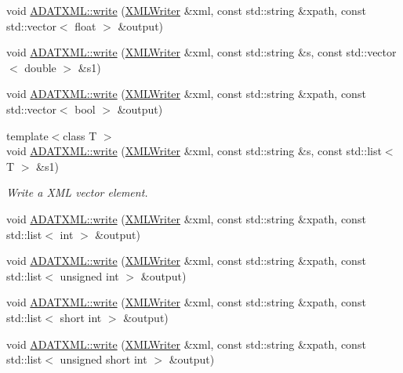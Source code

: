 \begin{DoxyCompactItemize}
\item 
void \mbox{\hyperlink{group__io_ga21089f03811e37a0d78c969c6a611f59}{A\+D\+A\+T\+X\+M\+L\+::write}} (\mbox{\hyperlink{classADATXML_1_1XMLWriter}{X\+M\+L\+Writer}} \&xml, const std\+::string \&xpath, const std\+::vector$<$ float $>$ \&output)
\item 
void \mbox{\hyperlink{group__io_gab54b00e1a7cbc507061351d54d6de9fe}{A\+D\+A\+T\+X\+M\+L\+::write}} (\mbox{\hyperlink{classADATXML_1_1XMLWriter}{X\+M\+L\+Writer}} \&xml, const std\+::string \&s, const std\+::vector$<$ double $>$ \&s1)
\item 
void \mbox{\hyperlink{group__io_ga5ca658ba9d302064625a4be34293839a}{A\+D\+A\+T\+X\+M\+L\+::write}} (\mbox{\hyperlink{classADATXML_1_1XMLWriter}{X\+M\+L\+Writer}} \&xml, const std\+::string \&xpath, const std\+::vector$<$ bool $>$ \&output)
\item 
{\footnotesize template$<$class T $>$ }\\void \mbox{\hyperlink{group__io_ga442a3dd5472737a074d3774f46a94f14}{A\+D\+A\+T\+X\+M\+L\+::write}} (\mbox{\hyperlink{classADATXML_1_1XMLWriter}{X\+M\+L\+Writer}} \&xml, const std\+::string \&s, const std\+::list$<$ T $>$ \&s1)
\begin{DoxyCompactList}\small\item\em Write a X\+ML vector element. \end{DoxyCompactList}\item 
void \mbox{\hyperlink{group__io_gaab9fb8d6cd603f8b6b5c6b493935eade}{A\+D\+A\+T\+X\+M\+L\+::write}} (\mbox{\hyperlink{classADATXML_1_1XMLWriter}{X\+M\+L\+Writer}} \&xml, const std\+::string \&xpath, const std\+::list$<$ int $>$ \&output)
\item 
void \mbox{\hyperlink{group__io_ga6026879ab5fc4a25f24c2f9f88d731b5}{A\+D\+A\+T\+X\+M\+L\+::write}} (\mbox{\hyperlink{classADATXML_1_1XMLWriter}{X\+M\+L\+Writer}} \&xml, const std\+::string \&xpath, const std\+::list$<$ unsigned int $>$ \&output)
\item 
void \mbox{\hyperlink{group__io_ga9e8def0c78f0db9648bdf8a6ef4b0832}{A\+D\+A\+T\+X\+M\+L\+::write}} (\mbox{\hyperlink{classADATXML_1_1XMLWriter}{X\+M\+L\+Writer}} \&xml, const std\+::string \&xpath, const std\+::list$<$ short int $>$ \&output)
\item 
void \mbox{\hyperlink{group__io_ga9b4ce3375767d9485b3d5dcbf535d4a4}{A\+D\+A\+T\+X\+M\+L\+::write}} (\mbox{\hyperlink{classADATXML_1_1XMLWriter}{X\+M\+L\+Writer}} \&xml, const std\+::string \&xpath, const std\+::list$<$ unsigned short int $>$ \&output)
\item 

\end{DoxyCompactItemize}
